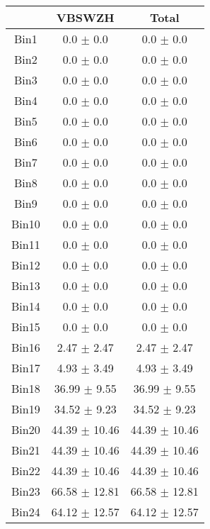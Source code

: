   \begin{tabular}{|c|c|c|}
  \hline
      & VBSWZH & Total \\ \cline{1-3} 
     \hline\hline
     Bin1 & 0.0 $\pm$ 0.0 & 0.0 $\pm$ 0.0 \\ \cline{1-3} 
     Bin2 & 0.0 $\pm$ 0.0 & 0.0 $\pm$ 0.0 \\ \cline{1-3} 
     Bin3 & 0.0 $\pm$ 0.0 & 0.0 $\pm$ 0.0 \\ \cline{1-3} 
     Bin4 & 0.0 $\pm$ 0.0 & 0.0 $\pm$ 0.0 \\ \cline{1-3} 
     Bin5 & 0.0 $\pm$ 0.0 & 0.0 $\pm$ 0.0 \\ \cline{1-3} 
     Bin6 & 0.0 $\pm$ 0.0 & 0.0 $\pm$ 0.0 \\ \cline{1-3} 
     Bin7 & 0.0 $\pm$ 0.0 & 0.0 $\pm$ 0.0 \\ \cline{1-3} 
     Bin8 & 0.0 $\pm$ 0.0 & 0.0 $\pm$ 0.0 \\ \cline{1-3} 
     Bin9 & 0.0 $\pm$ 0.0 & 0.0 $\pm$ 0.0 \\ \cline{1-3} 
     Bin10 & 0.0 $\pm$ 0.0 & 0.0 $\pm$ 0.0 \\ \cline{1-3} 
     Bin11 & 0.0 $\pm$ 0.0 & 0.0 $\pm$ 0.0 \\ \cline{1-3} 
     Bin12 & 0.0 $\pm$ 0.0 & 0.0 $\pm$ 0.0 \\ \cline{1-3} 
     Bin13 & 0.0 $\pm$ 0.0 & 0.0 $\pm$ 0.0 \\ \cline{1-3} 
     Bin14 & 0.0 $\pm$ 0.0 & 0.0 $\pm$ 0.0 \\ \cline{1-3} 
     Bin15 & 0.0 $\pm$ 0.0 & 0.0 $\pm$ 0.0 \\ \cline{1-3} 
     Bin16 & 2.47 $\pm$ 2.47 & 2.47 $\pm$ 2.47 \\ \cline{1-3} 
     Bin17 & 4.93 $\pm$ 3.49 & 4.93 $\pm$ 3.49 \\ \cline{1-3} 
     Bin18 & 36.99 $\pm$ 9.55 & 36.99 $\pm$ 9.55 \\ \cline{1-3} 
     Bin19 & 34.52 $\pm$ 9.23 & 34.52 $\pm$ 9.23 \\ \cline{1-3} 
     Bin20 & 44.39 $\pm$ 10.46 & 44.39 $\pm$ 10.46 \\ \cline{1-3} 
     Bin21 & 44.39 $\pm$ 10.46 & 44.39 $\pm$ 10.46 \\ \cline{1-3} 
     Bin22 & 44.39 $\pm$ 10.46 & 44.39 $\pm$ 10.46 \\ \cline{1-3} 
     Bin23 & 66.58 $\pm$ 12.81 & 66.58 $\pm$ 12.81 \\ \cline{1-3} 
     Bin24 & 64.12 $\pm$ 12.57 & 64.12 $\pm$ 12.57 \\ \cline{1-3} 

\end{tabular}
